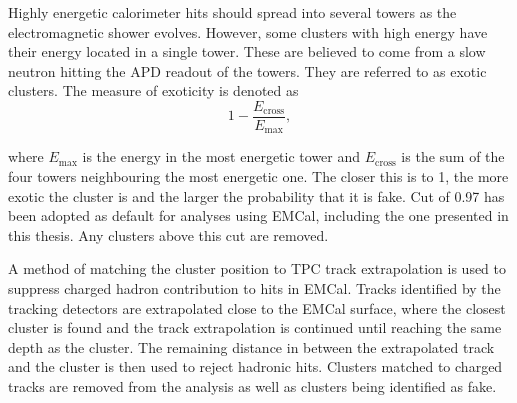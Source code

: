 Highly energetic calorimeter hits should spread into several towers as the electromagnetic shower evolves. However, some clusters with high energy have their energy located in a single tower. These are believed to come from a slow neutron hitting the APD readout of the towers. They are referred to as exotic clusters. The measure of exoticity is denoted as 
\begin{equation}
1 -\frac{E_\mathrm{cross}}{E_\mathrm{max}},
\end{equation}

\noindent where $E_\mathrm{max}$ is the energy in the most energetic tower and $E_\mathrm{cross}$ is the sum of the four towers neighbouring the most energetic one. The closer this is to 1, the more exotic the cluster is and the larger the probability that it is fake. Cut of 0.97 has been adopted as default for analyses using EMCal, including the one presented in this thesis. Any clusters above this cut are removed.

A method of matching the cluster position to TPC track extrapolation is used to suppress charged hadron contribution to hits in EMCal. Tracks identified by the tracking detectors are extrapolated close to the EMCal surface, where the closest cluster is found and the track extrapolation is continued until reaching the same depth as the cluster. The remaining distance in between the extrapolated track and the cluster is then used to reject hadronic hits. Clusters matched to charged tracks are removed from the analysis as well as clusters being identified as fake. 










